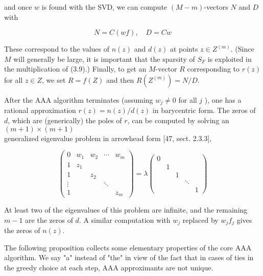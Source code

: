 \documentclass[11pt]{article}
\theoremstyle{definition}
\begin{document}
    
    and once $w$ is found with the SVD, we can compute $(M-m)$-vectors $N$ and $D$ with
    
    
    \begin{equation*}
    N=C(w f), \quad D=C w \tag{3.10}
    \end{equation*}
    
    
    These correspond to the values of $n(z)$ and $d(z)$ at points $z \in Z^{(m)}$. (Since $M$ will generally be large, it is important that the sparsity of $S_{F}$ is exploited in the multiplication of (3.9).) Finally, to get an $M$-vector $R$ corresponding to $r(z)$ for all $z \in Z$, we set $R=f(Z)$ and then $R\left(Z^{(m)}\right)=N / D$.
    
    After the AAA algorithm terminates (assuming $w_{j} \neq 0$ for all $j$ ), one has a rational approximation $r(z)=n(z) / d(z)$ in barycentric form. The zeros of $d$, which are (generically) the poles of $r$, can be computed by solving an $(m+1) \times(m+1)$\\[0pt]
    generalized eigenvalue problem in arrowhead form [47, sect. 2.3.3],
    
    \[
    \left(\begin{array}{ccccc}
    0 & w_{1} & w_{2} & \cdots & w_{m}  \tag{3.11}\\
    1 & z_{1} & & & \\
    1 & & z_{2} & & \\
    \vdots & & & \ddots & \\
    1 & & & & z_{m}
    \end{array}\right)=\lambda\left(\begin{array}{ccccc}
    0 & & & & \\
    & 1 & & & \\
    & & 1 & & \\
    & & & \ddots & \\
    & & & & 1
    \end{array}\right)
    \]
    
    At least two of the eigenvalues of this problem are infinite, and the remaining $m-1$ are the zeros of $d$. A similar computation with $w_{j}$ replaced by $w_{j} f_{j}$ gives the zeros of $n(z)$.
    
    The following proposition collects some elementary properties of the core AAA algorithm. We say "a" instead of "the" in view of the fact that in cases of ties in the greedy choice at each step, AAA approximants are not unique.
    
\end{document}
